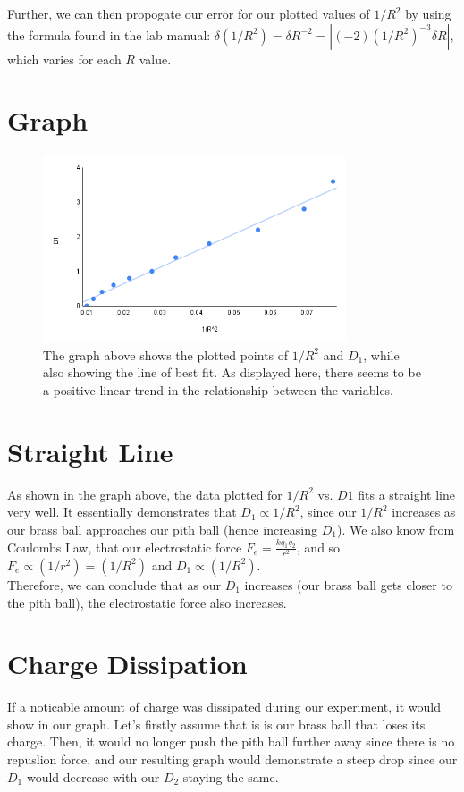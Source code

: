 \documentclass[12pt]{article}
\begin{document}
\noindent Further, we can then propogate our error for our plotted values of $1/R^2$ by using the formula found in the lab manual:
$\delta (1/R^2) = \delta R^{-2} = |(-2)(1/R^2)^{-3}\delta R|$, which varies for each $R$ value.

\section{Graph}

\begin{figure}[h]
    \centering
    \includegraphics[width=0.8\textwidth]{Lab 2 Graph.png}
    \caption{The graph above shows the plotted points of $1/R^2$ and $D_1$,
    while also showing the line of best fit. As displayed here, there seems to be a positive
    linear trend in the relationship between the variables.}
    \label{fig:graph}
\end{figure}

\pagebreak
\section{Straight Line}
As shown in the graph above, the data plotted for $1/R^2$ vs. $D1$ fits a straight line very well.
It essentially demonstrates that $D_1 \propto 1/R^2$, since our $1/R^2$ increases as our brass ball
approaches our pith ball (hence increasing $D_1$). We also know from Coulombs Law, that our electrostatic force
$F_e = \frac{kq_1q_2}{r^2}$, and so $F_e \propto (1/r^2) = (1/R^2)$ and $D_1 \propto (1/R^2)$. \\

\noindent Therefore, we can conclude that as our $D_1$ increases (our brass ball gets closer to the pith ball),
the electrostatic force also increases.

\section{Charge Dissipation}
If a noticable amount of charge was dissipated during our experiment, it would show in our graph.
Let's firstly assume that is is our brass ball that loses its charge. Then, it would no longer push the pith ball further away since there is no repuslion force,
and our resulting graph would demonstrate a steep drop since our $D_1$ would decrease with our $D_2$ staying the same. \\ 
\end{document}
